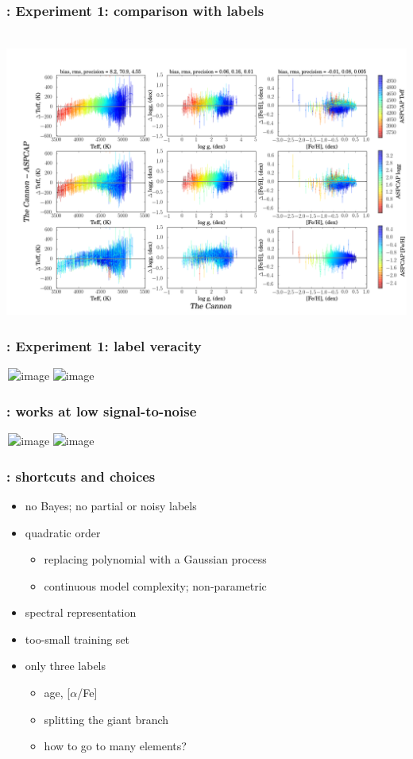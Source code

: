 \documentclass[pdftex]{beamer}
\begin{document}
\results

\begin{frame}
  \frametitle{\tc: Experiment 1: comparison with \textsl{} labels}
  \,\hfill\includegraphics[height=\figureheight]{../documents/paper1/plots/cplot2.png} 
\end{frame}

\begin{frame}
  \frametitle{\tc: Experiment 1: label veracity}
  \,\hfill\includegraphics<1>[height=\figureheight]{../documents/paper1/plots/iso2_2.png}
         \includegraphics<2>[height=\figureheight]{../documents/paper1/plots/iso2a_2.png}
\end{frame}

\begin{frame}
  \frametitle{\tc: works at low signal-to-noise}
  \,\hfill\includegraphics<1>[height=\figureheight]{../documents/paper1/plots/SNR100to200.png}
         \includegraphics<2>[height=\figureheight]{../documents/paper1/plots/SNR20to30.png}
\end{frame}

\results

\begin{frame}
  \frametitle{\tc: shortcuts and choices}
  \begin{itemize}
  \item no Bayes; no partial or noisy labels
  \item quadratic order
    \begin{itemize}
    \item replacing polynomial with a Gaussian process
    \item continuous model complexity; non-parametric
    \end{itemize}
  \item spectral representation
  \item too-small training set
  \item only three labels
    \begin{itemize}
    \item age, [$\alpha$/Fe]
    \item splitting the giant branch
    \item how to go to many elements?
    \end{itemize}
  \end{itemize}
\end{frame}
\end{document}
